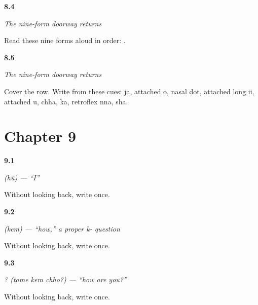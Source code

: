 \noindent\begin{minipage}[t]{\linewidth}
\raggedright
\hypertarget{review-GU-R04-doorway-nine-r2-reading}{\textbf{8.4}} \emph{The nine-form doorway returns}\par
\small Read these nine forms aloud in order:         .
\end{minipage}\par\medskip

\noindent\begin{minipage}[t]{\linewidth}
\raggedright
\hypertarget{review-GU-R04-doorway-nine-r2-dictation}{\textbf{8.5}} \emph{The nine-form doorway returns}\par
\small Cover the row. Write from these cues: ja, attached o, nasal dot, attached long ii, attached u, chha, ka, retroflex nna, sha.
\end{minipage}\par\medskip

\section*{Chapter 9}

\noindent\begin{minipage}[t]{\linewidth}
\raggedright
\hypertarget{review-GU-C03-hun-ya-retrieval}{\textbf{9.1}} \emph{ (hũ) — \textquotedblleft{}I\textquotedblright{}}\par
\small Without looking back, write  once.
\end{minipage}\par\medskip

\noindent\begin{minipage}[t]{\linewidth}
\raggedright
\hypertarget{review-GU-C03-kem-bha-retrieval}{\textbf{9.2}} \emph{ (kem) — \textquotedblleft{}how,\textquotedblright{} a proper k- question}\par
\small Without looking back, write  once.
\end{minipage}\par\medskip

\noindent\begin{minipage}[t]{\linewidth}
\raggedright
\hypertarget{review-GU-C03-tame-kem-chho-dha-retrieval}{\textbf{9.3}} \emph{  ? (tame kem chho?) — \textquotedblleft{}how are you?\textquotedblright{}}\par
\small Without looking back, write  once.
\end{minipage}\par\medskip


